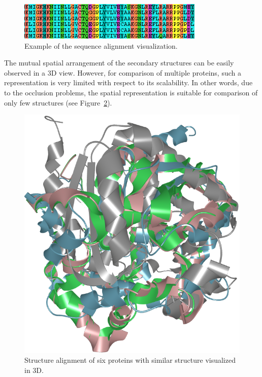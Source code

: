 \documentclass[twocolumn]{bmcart}%
\begin{document}
\begin{figure}[th]
  \centering
  \includegraphics[width=0.9\columnwidth]{pics/align.png}
  \caption{Example of the sequence alignment visualization.}
  \label{fig:align}
\end{figure}

The mutual spatial arrangement of the secondary structures can be easily observed in a 3D view. 
However, for comparison of multiple proteins, such a representation is very limited with respect to its scalability.
In other words, due to the occlusion problems, the spatial representation is suitable for comparison of only few structures (see Figure~\ref{fig:many}).


\begin{figure}[th]
  \centering
  \includegraphics[width=0.9\columnwidth]{pics/many.png}
  \caption{Structure alignment of six proteins with similar structure visualized in 3D.}
  \label{fig:many}
\end{figure}
\end{document}
